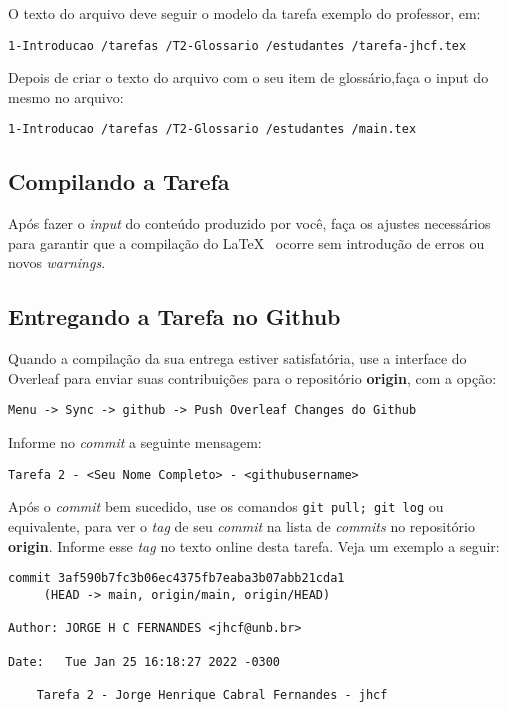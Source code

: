 O texto do arquivo deve seguir o modelo da tarefa exemplo do professor, em:
\begin{verbatim}
1-Introducao /tarefas /T2-Glossario /estudantes /tarefa-jhcf.tex
\end{verbatim}

Depois de criar o texto do arquivo com o seu item de glossário,faça o input do mesmo no arquivo:
\begin{verbatim}
1-Introducao /tarefas /T2-Glossario /estudantes /main.tex
\end{verbatim}

\subsection{Compilando a Tarefa}

Após fazer o \textit{input} do conteúdo produzido por você, faça os ajustes necessários para garantir que a compilação do \LaTeX~ ocorre sem introdução de erros ou novos \textit{warnings}.

\subsection{Entregando a Tarefa no Github}

Quando a compilação da sua entrega estiver satisfatória, use a interface do Overleaf para enviar suas contribuições para o repositório \textbf{origin}, com a opção:

\begin{verbatim}
Menu -> Sync -> github -> Push Overleaf Changes do Github
\end{verbatim}

Informe no \textit{commit} a seguinte mensagem: 
\begin{verbatim}
Tarefa 2 - <Seu Nome Completo> - <githubusername>
\end{verbatim}

Após o \textit{commit} bem sucedido, use os comandos \verb|git pull; git log| ou equivalente, para ver o \textit{tag} de seu \textit{commit} na lista de \textit{commits} no repositório \textbf{origin}. Informe esse \textit{tag} no texto online desta tarefa. 
Veja um exemplo a seguir:

\begin{verbatim}
commit 3af590b7fc3b06ec4375fb7eaba3b07abb21cda1 
     (HEAD -> main, origin/main, origin/HEAD)

Author: JORGE H C FERNANDES <jhcf@unb.br>

Date:   Tue Jan 25 16:18:27 2022 -0300

    Tarefa 2 - Jorge Henrique Cabral Fernandes - jhcf
\end{verbatim}

